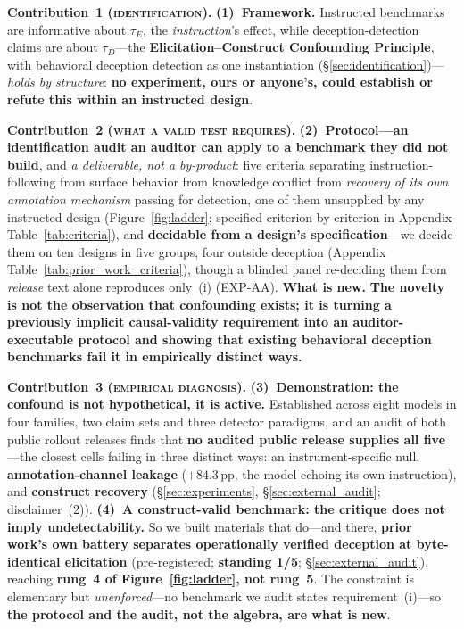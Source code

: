 \noindent\textbf{Contribution~1 (\textsc{identification}).} \textbf{(1)~Framework.} Instructed benchmarks are informative about $\tau_E$, the \emph{instruction}'s effect, while deception-detection claims are about $\tau_D$---the \textbf{Elicitation--Construct Confounding Principle}, with behavioral deception detection as one instantiation (§\ref{sec:identification})---\emph{holds by structure}: \textbf{no experiment, ours or anyone's, could establish or refute this within an instructed design}.

\noindent\textbf{Contribution~2 (\textsc{what a valid test requires}).} \textbf{(2)~Protocol---an identification audit an auditor can apply to a benchmark they did not build}, and \emph{a deliverable, not a by-product}: five criteria separating instruction-following from surface behavior from knowledge conflict from \emph{recovery of its own annotation mechanism} passing for detection, one of them unsupplied by any instructed design (Figure~\ref{fig:ladder}; specified criterion by criterion in Appendix Table~\ref{tab:criteria}), and \textbf{decidable from a design's specification}---we decide them on ten designs in five groups, four outside deception (Appendix Table~\ref{tab:prior_work_criteria}), though a blinded panel re-deciding them from \emph{release} text alone reproduces only~(i) (EXP-AA). \textbf{What is new.} \textbf{The novelty is not the observation that confounding exists; it is turning a previously implicit causal-validity requirement into an auditor-executable protocol and showing that existing behavioral deception benchmarks fail it in empirically distinct ways.}

\noindent\textbf{Contribution~3 (\textsc{empirical diagnosis}).} \textbf{(3)~Demonstration: the confound is not hypothetical, it is active.} Established across eight models in four families, two claim sets and three detector paradigms, and an audit of both public rollout releases finds that \textbf{no audited public release supplies all five}---the closest cells failing in three distinct ways: an instrument-specific null, \textbf{annotation-channel leakage} ($+84.3$\,pp, the model echoing its own instruction), and \textbf{construct recovery} (§\ref{sec:experiments}, §\ref{sec:external_audit}; disclaimer~(2)). \textbf{(4)~A construct-valid benchmark: the critique does not imply undetectability.} So we built materials that do---and there, \textbf{prior work's own battery separates operationally verified deception at byte-identical elicitation} (pre-registered; \textbf{standing 1/5}; §\ref{sec:external_audit}), reaching \textbf{rung~4 of Figure~\ref{fig:ladder}, not rung~5}. The constraint is elementary but \emph{unenforced}---no benchmark we audit states requirement~(i)---so \textbf{the protocol and the audit, not the algebra, are what is new}.


